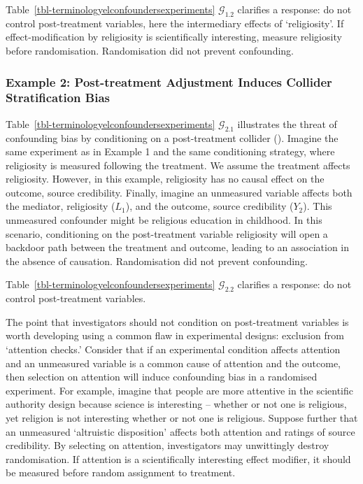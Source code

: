 \documentclass[
  single column]{article}
\begin{document}
Table~\ref{tbl-terminologyelconfoundersexperiments}
\(\mathcal{G}_{1.2}\) clarifies a response: do not control
post-treatment variables, here the intermediary effects of
`religiosity'. If effect-modification by religiosity is scientifically
interesting, measure religiosity before randomisation. Randomisation did
not prevent confounding.

\subsubsection{Example 2: Post-treatment Adjustment Induces Collider
Stratification
Bias}\label{example-2-post-treatment-adjustment-induces-collider-stratification-bias}

Table~\ref{tbl-terminologyelconfoundersexperiments}
\(\mathcal{G}_{2.1}\) illustrates the threat of confounding bias by
conditioning on a post-treatment collider (). Imagine the same experiment as in Example 1 and
the same conditioning strategy, where religiosity is measured following
the treatment. We assume the treatment affects religiosity. However, in
this example, religiosity has no causal effect on the outcome, source
credibility. Finally, imagine an unmeasured variable affects both the
mediator, religiosity (\(L_1\)), and the outcome, source credibility
(\(Y_2\)). This unmeasured confounder might be religious education in
childhood. In this scenario, conditioning on the post-treatment variable
religiosity will open a backdoor path between the treatment and outcome,
leading to an association in the absence of causation. Randomisation did
not prevent confounding.

Table~\ref{tbl-terminologyelconfoundersexperiments}
\(\mathcal{G}_{2.2}\) clarifies a response: do not control
post-treatment variables.

The point that investigators should not condition on post-treatment
variables is worth developing using a common flaw in experimental
designs: exclusion from `attention checks.' Consider that if an
experimental condition affects attention and an unmeasured variable is a
common cause of attention and the outcome, then selection on attention
will induce confounding bias in a randomised experiment. For example,
imagine that people are more attentive in the scientific authority
design because science is interesting -- whether or not one is
religious, yet religion is not interesting whether or not one is
religious. Suppose further that an unmeasured `altruistic disposition'
affects both attention and ratings of source credibility. By selecting
on attention, investigators may unwittingly destroy randomisation. If
attention is a scientifically interesting effect modifier, it should be
measured before random assignment to treatment.
\end{document}

